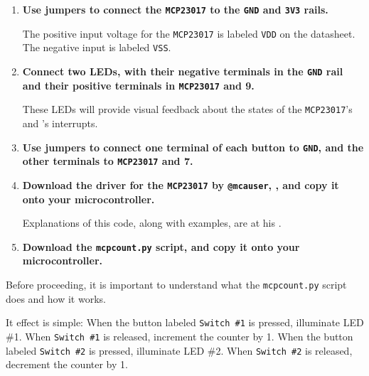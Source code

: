 \begin{enumerate}
  \item \textbf{Use jumpers to connect the \texttt{MCP23017} to the \texttt{GND} and \texttt{3V3} rails.}

	The positive input voltage for the \texttt{MCP23017} is labeled \texttt{V\small{DD}} on the datasheet.
	The negative input is labeled \texttt{V\small{SS}}.

  \item \textbf{Connect two LEDs, with their negative terminals in the \texttt{GND} rail and their positive terminals in \texttt{MCP23017}  and 9.}

	These LEDs will provide visual feedback about the states of the \texttt{MCP23017}'s and 's interrupts.

  \item \textbf{Use jumpers to connect one terminal of each button to \texttt{GND}, and the other terminals to \texttt{MCP23017}  and 7.}

  \item \textbf{Download the \Micropython driver for the \texttt{MCP23017} by \texttt{@mcauser}, , and copy it onto your microcontroller.}

	Explanations of this code, along with examples, are at his .

	\item \textbf{Download the \texttt{mcp\textunderscore count.py} script, and copy it onto your microcontroller.}
	

\end{enumerate}

Before proceeding, it is important to understand what the \texttt{mcp\textunderscore count.py} script does and how it works.

It effect is simple:
When the button labeled \texttt{Switch \#1} is pressed, illuminate LED \#1.
When  \texttt{Switch \#1} is released, increment the counter by 1.
When the button labeled \texttt{Switch \#2} is pressed, illuminate LED \#2.
When  \texttt{Switch \#2} is released, decrement the counter by 1.

